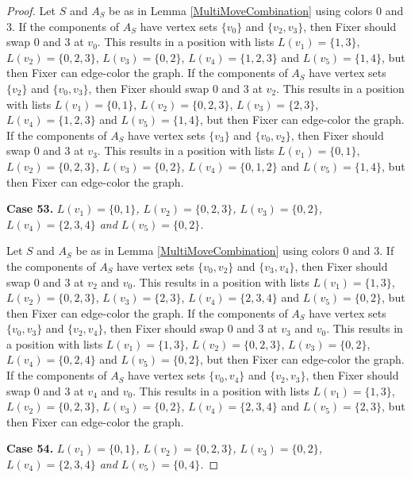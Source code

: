 \documentclass[12pt]{amsart}
\theoremstyle{plain}
\theoremstyle{definition}
\theoremstyle{remark}
\begin{document}
\begin{proof}
Let $S$ and $A_S$ be as in Lemma \ref{MultiMoveCombination} using colors $0$ and $3$. If the components of $A_S$ have vertex sets $\{v_0\}$ and $\{v_2, v_3\}$, then Fixer should swap 0 and 3 at $v_0$. This results in a position with lists $L(v_1) = \{1, 3\}$, $L(v_2) = \{0, 2, 3\}$, $L(v_3) = \{0, 2\}$, $L(v_4) = \{1, 2, 3\}$ and $L(v_5) = \{1, 4\}$, but then Fixer can edge-color the graph.
If the components of $A_S$ have vertex sets $\{v_2\}$ and $\{v_0, v_3\}$, then Fixer should swap 0 and 3 at $v_2$. This results in a position with lists $L(v_1) = \{0, 1\}$, $L(v_2) = \{0, 2, 3\}$, $L(v_3) = \{2, 3\}$, $L(v_4) = \{1, 2, 3\}$ and $L(v_5) = \{1, 4\}$, but then Fixer can edge-color the graph.
If the components of $A_S$ have vertex sets $\{v_3\}$ and $\{v_0, v_2\}$, then Fixer should swap 0 and 3 at $v_3$. This results in a position with lists $L(v_1) = \{0, 1\}$, $L(v_2) = \{0, 2, 3\}$, $L(v_3) = \{0, 2\}$, $L(v_4) = \{0, 1, 2\}$ and $L(v_5) = \{1, 4\}$, but then Fixer can edge-color the graph.

\noindent\textbf{Case 53.  }\textit{$L(v_1) = \{0, 1\}$, $L(v_2) = \{0, 2, 3\}$, $L(v_3) = \{0, 2\}$, $L(v_4) = \{2, 3, 4\}$ and $L(v_5) = \{0, 2\}$.}

Let $S$ and $A_S$ be as in Lemma \ref{MultiMoveCombination} using colors $0$ and $3$. If the components of $A_S$ have vertex sets $\{v_0, v_2\}$ and $\{v_3, v_4\}$, then Fixer should swap 0 and 3 at $v_2$ and $v_0$. This results in a position with lists $L(v_1) = \{1, 3\}$, $L(v_2) = \{0, 2, 3\}$, $L(v_3) = \{2, 3\}$, $L(v_4) = \{2, 3, 4\}$ and $L(v_5) = \{0, 2\}$, but then Fixer can edge-color the graph.
If the components of $A_S$ have vertex sets $\{v_0, v_3\}$ and $\{v_2, v_4\}$, then Fixer should swap 0 and 3 at $v_3$ and $v_0$. This results in a position with lists $L(v_1) = \{1, 3\}$, $L(v_2) = \{0, 2, 3\}$, $L(v_3) = \{0, 2\}$, $L(v_4) = \{0, 2, 4\}$ and $L(v_5) = \{0, 2\}$, but then Fixer can edge-color the graph.
If the components of $A_S$ have vertex sets $\{v_0, v_4\}$ and $\{v_2, v_3\}$, then Fixer should swap 0 and 3 at $v_4$ and $v_0$. This results in a position with lists $L(v_1) = \{1, 3\}$, $L(v_2) = \{0, 2, 3\}$, $L(v_3) = \{0, 2\}$, $L(v_4) = \{2, 3, 4\}$ and $L(v_5) = \{2, 3\}$, but then Fixer can edge-color the graph.

\noindent\textbf{Case 54.  }\textit{$L(v_1) = \{0, 1\}$, $L(v_2) = \{0, 2, 3\}$, $L(v_3) = \{0, 2\}$, $L(v_4) = \{2, 3, 4\}$ and $L(v_5) = \{0, 4\}$.}


\end{proof}
\end{document}
